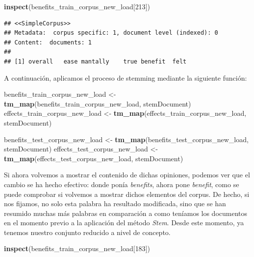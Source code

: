 \documentclass[spanish,]{article}
\newenvironment{Shaded}{\begin{snugshade}}{\end{snugshade}}
\newcommand{\KeywordTok}[1]{\textcolor[rgb]{0.13,0.29,0.53}{\textbf{#1}}}
\newcommand{\DecValTok}[1]{\textcolor[rgb]{0.00,0.00,0.81}{#1}}
\newcommand{\StringTok}[1]{\textcolor[rgb]{0.31,0.60,0.02}{#1}}
\newcommand{\NormalTok}[1]{#1}
\begin{document}
\begin{Shaded}
\begin{Highlighting}[]
\KeywordTok{inspect}\NormalTok{(benefits_train_corpus_new_load[}\DecValTok{213}\NormalTok{])}
\end{Highlighting}
\end{Shaded}

\begin{verbatim}
## <<SimpleCorpus>>
## Metadata:  corpus specific: 1, document level (indexed): 0
## Content:  documents: 1
## 
## [1] overall   ease mantally    true benefit  felt
\end{verbatim}

A continuación, aplicamos el proceso de stemming mediante la siguiente
función:

\begin{Shaded}
\begin{Highlighting}[]
\NormalTok{benefits_train_corpus_new_load <-}\StringTok{ }\KeywordTok{tm_map}\NormalTok{(benefits_train_corpus_new_load, stemDocument)}
\NormalTok{effects_train_corpus_new_load <-}\StringTok{ }\KeywordTok{tm_map}\NormalTok{(effects_train_corpus_new_load, stemDocument)}

\NormalTok{benefits_test_corpus_new_load <-}\StringTok{ }\KeywordTok{tm_map}\NormalTok{(benefits_test_corpus_new_load, stemDocument)}
\NormalTok{effects_test_corpus_new_load <-}\StringTok{ }\KeywordTok{tm_map}\NormalTok{(effects_test_corpus_new_load, stemDocument)}
\end{Highlighting}
\end{Shaded}

Si ahora volvemos a mostrar el contenido de dichas opiniones, podemos
ver que el cambio se ha hecho efectivo: donde ponía \textit{benefits},
ahora pone \textit{benefit}, como se puede comprobar si volvemos a
mostrar dichos elementos del corpus. De hecho, si nos fijamos, no solo
esta palabra ha resultado modificada, sino que se han resumido muchas
más palabras en comparación a como teníamos los documentos en el momento
previo a la aplicación del método \textit{Stem}. Desde este momento, ya
tenemos nuestro conjunto reducido a nivel de concepto.

\begin{Shaded}
\begin{Highlighting}[]
\KeywordTok{inspect}\NormalTok{(benefits_train_corpus_new_load[}\DecValTok{183}\NormalTok{])}
\end{Highlighting}
\end{Shaded}
\end{document}
